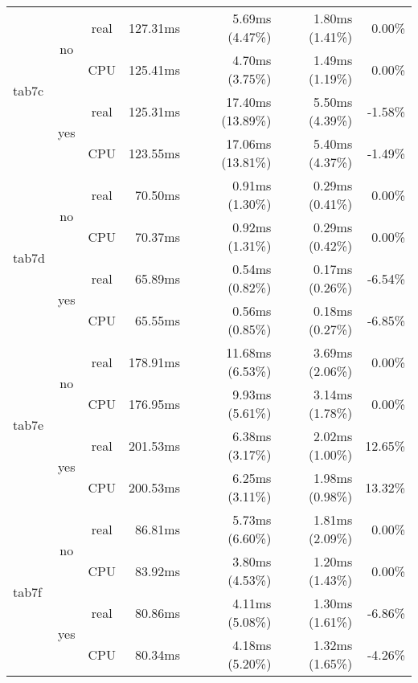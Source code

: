 \documentclass[en]{pracamgr}
\begin{document}
\begin{small}
\begin{longtable}{|l|c|c|r|r|r|r|}
\hline
\multirow{4}{*}{tab7c}    & \multirow{2}{*}{no}  & real & 127.31ms & 5.69ms (4.47\%) & 1.80ms (1.41\%) & 0.00\% \\*
                          &                      & CPU  & 125.41ms & 4.70ms (3.75\%) & 1.49ms (1.19\%) & 0.00\% \\*
                          \cline{2-7}
                          & \multirow{2}{*}{yes} & real & 125.31ms & 17.40ms (13.89\%) & 5.50ms (4.39\%) & -1.58\% \\*
                          &                      & CPU  & 123.55ms & 17.06ms (13.81\%) & 5.40ms (4.37\%) & -1.49\% \\
\hline
\multirow{4}{*}{tab7d}    & \multirow{2}{*}{no}  & real & 70.50ms & 0.91ms (1.30\%) & 0.29ms (0.41\%) & 0.00\% \\*
                          &                      & CPU  & 70.37ms & 0.92ms (1.31\%) & 0.29ms (0.42\%) & 0.00\% \\*
                          \cline{2-7}
                          & \multirow{2}{*}{yes} & real & 65.89ms & 0.54ms (0.82\%) & 0.17ms (0.26\%) & -6.54\% \\*
                          &                      & CPU  & 65.55ms & 0.56ms (0.85\%) & 0.18ms (0.27\%) & -6.85\% \\
\hline
\multirow{4}{*}{tab7e}    & \multirow{2}{*}{no}  & real & 178.91ms & 11.68ms (6.53\%) & 3.69ms (2.06\%) & 0.00\% \\*
                          &                      & CPU  & 176.95ms & 9.93ms (5.61\%) & 3.14ms (1.78\%) & 0.00\% \\*
                          \cline{2-7}
                          & \multirow{2}{*}{yes} & real & 201.53ms & 6.38ms (3.17\%) & 2.02ms (1.00\%) & 12.65\% \\*
                          &                      & CPU  & 200.53ms & 6.25ms (3.11\%) & 1.98ms (0.98\%) & 13.32\% \\
\hline
\multirow{4}{*}{tab7f}    & \multirow{2}{*}{no}  & real & 86.81ms & 5.73ms (6.60\%) & 1.81ms (2.09\%) & 0.00\% \\*
                          &                      & CPU  & 83.92ms & 3.80ms (4.53\%) & 1.20ms (1.43\%) & 0.00\% \\*
                          \cline{2-7}
                          & \multirow{2}{*}{yes} & real & 80.86ms & 4.11ms (5.08\%) & 1.30ms (1.61\%) & -6.86\% \\*
                          &                      & CPU  & 80.34ms & 4.18ms (5.20\%) & 1.32ms (1.65\%) & -4.26\% \\

\end{longtable}
\end{small}
\end{document}
